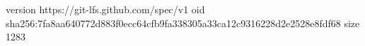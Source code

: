 version https://git-lfs.github.com/spec/v1
oid sha256:7fa8aa640772d883f0ecc64cfb9fa338305a33ca12c9316228d2e2528e8fdf68
size 1283
